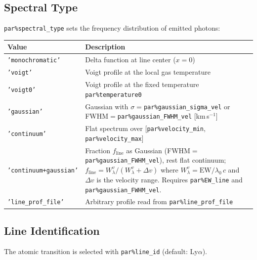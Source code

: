 \documentclass[english,a4paper]{my_memo}
\newcommand{\parm}[1]{\texttt{par\%#1}}
\begin{document}
\subsection{Spectral Type}
\label{sec:spectral_type}

\parm{spectral\_type} sets the frequency distribution of emitted photons:

\begin{center}
\begin{tabular}{L{3.5cm}L{9.5cm}}
\toprule
Value & Description \\
\midrule
\texttt{'monochromatic'} & Delta function at line center ($x = 0$) \\
\texttt{'voigt'} & Voigt profile at the local gas temperature \\
\texttt{'voigt0'} & Voigt profile at the fixed temperature \parm{temperature0} \\
\texttt{'gaussian'} & Gaussian with $\sigma=$\parm{gaussian\_sigma\_vel} or FWHM$=$\parm{gaussian\_FWHM\_vel} [km\,s$^{-1}$] \\
\texttt{'continuum'} & Flat spectrum over [\parm{velocity\_min}, \parm{velocity\_max}] \\
\texttt{'continuum+gaussian'} & Fraction $f_\text{line}$ as Gaussian (FWHM$=$\parm{gaussian\_FWHM\_vel}), rest flat continuum; $f_\text{line} = W_\lambda^v / (W_\lambda^v + \Delta v)$ where $W_\lambda^v = \text{EW}/\lambda_0\,c$ and $\Delta v$ is the velocity range. Requires \parm{EW\_line} and \parm{gaussian\_FWHM\_vel}. \\
\texttt{'line\_prof\_file'} & Arbitrary profile read from \parm{line\_prof\_file} \\
\bottomrule
\end{tabular}
\end{center}

\subsection{Line Identification}
\label{sec:lineid}

The atomic transition is selected with \parm{line\_id} (default: Ly$\alpha$).
\end{document}
